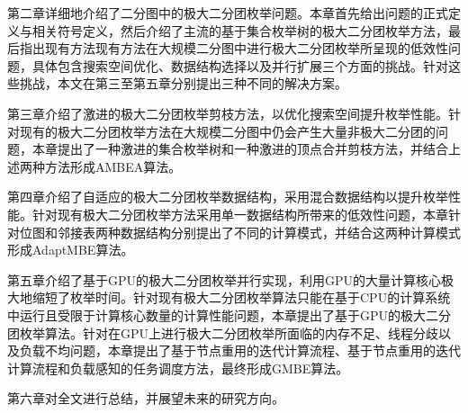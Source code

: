 第二章详细地介绍了二分图中的极大二分团枚举问题。本章首先给出问题的正式定义与相关符号定义，然后介绍了主流的基于集合枚举树的极大二分团枚举方法，最后指出现有方法现有方法在大规模二分图中进行极大二分团枚举所呈现的低效性问题，具体包含搜索空间优化、数据结构选择以及并行扩展三个方面的挑战。针对这些挑战，本文在第三至第五章分别提出三种不同的解决方案。

第三章介绍了激进的极大二分团枚举剪枝方法，以优化搜索空间提升枚举性能。针对现有的极大二分团枚举方法在大规模二分图中仍会产生大量非极大二分团的问题，本章提出了一种激进的集合枚举树和一种激进的顶点合并剪枝方法，并结合上述两种方法形成AMBEA算法。%

第四章介绍了自适应的极大二分团枚举数据结构，采用混合数据结构以提升枚举性能。针对现有极大二分团枚举方法采用单一数据结构所带来的低效性问题，本章针对位图和邻接表两种数据结构分别提出了不同的计算模式，并结合这两种计算模式形成AdaptMBE算法。%

第五章介绍了基于GPU的极大二分团枚举并行实现，利用GPU的大量计算核心极大地缩短了枚举时间。针对现有极大二分团枚举算法只能在基于CPU的计算系统中运行且受限于计算核心数量的计算性能问题，本章提出了基于GPU的极大二分团枚举算法。针对在GPU上进行极大二分团枚举所面临的内存不足、线程分歧以及负载不均问题，本章提出了基于节点重用的迭代计算流程、基于节点重用的迭代计算流程和负载感知的任务调度方法，最终形成GMBE算法。%

第六章对全文进行总结，并展望未来的研究方向。



